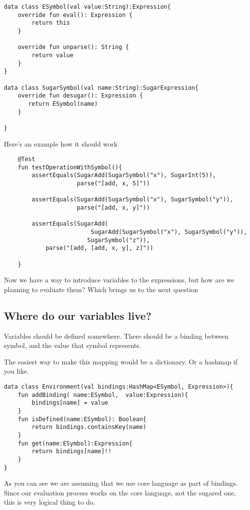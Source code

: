 \documentclass[11pt]{article}
\begin{document}
\begin{verbatim}
data class ESymbol(val value:String):Expression{
    override fun eval(): Expression {
        return this
    }

    override fun unparse(): String {
        return value
    }
}

data class SugarSymbol(val name:String):SugarExpression{
    override fun desugar(): Expression {
       return ESymbol(name)
    }

}
\end{verbatim}
Here's an example how it should work
\begin{verbatim}
    @Test
    fun testOperationWithSymbol(){
        assertEquals(SugarAdd(SugarSymbol("x"), SugarInt(5)),
                     parse("[add, x, 5]"))

        assertEquals(SugarAdd(SugarSymbol("x"), SugarSymbol("y")),
                     parse("[add, x, y]"))

        assertEquals(SugarAdd(
                         SugarAdd(SugarSymbol("x"), SugarSymbol("y")),
                        SugarSymbol("z")),
            parse("[add, [add, x, y], z]"))

    }
\end{verbatim}
Now we have a way to introduce variables to the expressions, but how are we planning to evaluate them?
Which brings us to the next question
\subsection{Where do our variables live?}
\label{sec:org9f156c3}
Variables should be defined somewhere. There should be a binding between symbol, and the value that symbol represents.

The easiest way to make this mapping would be a dictionary. Or a hashmap if you like.

\begin{verbatim}
data class Environment(val bindings:HashMap<ESymbol, Expression>){
    fun addBinding( name:ESymbol,  value:Expression){
        bindings[name] = value
    }
    fun isDefined(name:ESymbol): Boolean{
        return bindings.containsKey(name)
    }
    fun get(name:ESymbol):Expression{
        return bindings[name]!!
    }
}
\end{verbatim}
As you can see we are assuming that we use core language as part of bindings.
Since our evaluation process works on the core language, not the sugared one, this is very logical thing to do.
\end{document}
